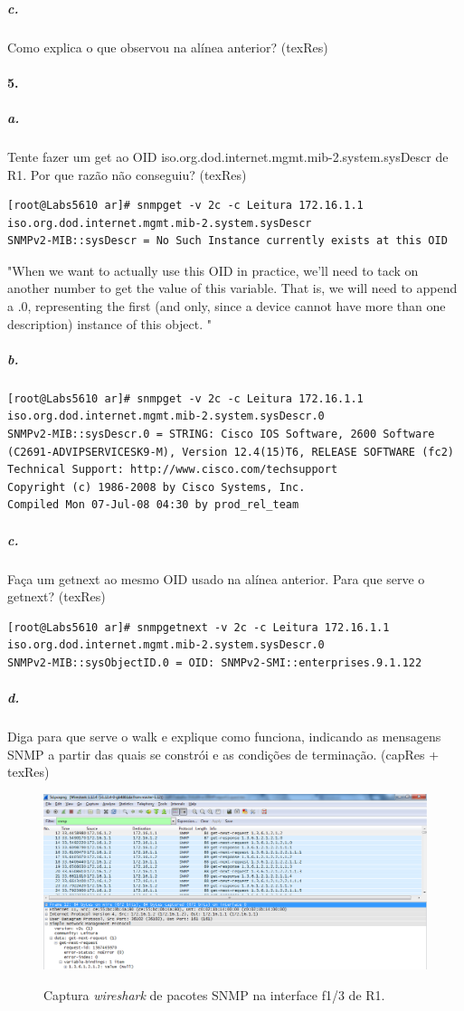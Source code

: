 \subparagraph{c.}
Como explica o que observou na alínea anterior? (texRes)


\paragraph{5.}

\subparagraph{a.}
Tente fazer um get ao OID iso.org.dod.internet.mgmt.mib-2.system.sysDescr de R1. Por que razão não conseguiu? (texRes)

\begin{verbatim}
[root@Labs5610 ar]# snmpget -v 2c -c Leitura 172.16.1.1 iso.org.dod.internet.mgmt.mib-2.system.sysDescr
SNMPv2-MIB::sysDescr = No Such Instance currently exists at this OID
\end{verbatim}

"When we want to actually use this OID in practice, we’ll need to tack on another number to get the value of this variable. That is, we will need to append a .0, representing the first (and only, since a device cannot have more than one description) instance of this object.
"


\subparagraph{b.}
\begin{verbatim}
[root@Labs5610 ar]# snmpget -v 2c -c Leitura 172.16.1.1 iso.org.dod.internet.mgmt.mib-2.system.sysDescr.0
SNMPv2-MIB::sysDescr.0 = STRING: Cisco IOS Software, 2600 Software (C2691-ADVIPSERVICESK9-M), Version 12.4(15)T6, RELEASE SOFTWARE (fc2)
Technical Support: http://www.cisco.com/techsupport
Copyright (c) 1986-2008 by Cisco Systems, Inc.
Compiled Mon 07-Jul-08 04:30 by prod_rel_team
\end{verbatim}


\subparagraph{c.}
Faça um getnext ao mesmo OID usado na alínea anterior. Para que serve o getnext? (texRes)

\begin{verbatim}
[root@Labs5610 ar]# snmpgetnext -v 2c -c Leitura 172.16.1.1 iso.org.dod.internet.mgmt.mib-2.system.sysDescr.0
SNMPv2-MIB::sysObjectID.0 = OID: SNMPv2-SMI::enterprises.9.1.122
\end{verbatim}


\subparagraph{d.}
Diga para que serve o walk e explique como funciona, indicando as mensagens SNMP a partir das quais se constrói e as condições de terminação. (capRes + texRes)

\begin{figure}[h]
\centering
\includegraphics[width=1\textwidth, height=0.33\textheight]{5d.png}
\label{fig:7-capturaWireshark}
\caption{Captura \emph{wireshark} de pacotes SNMP na interface \textsf{f1/3} de \textsf{R1}.}
\end{figure}


